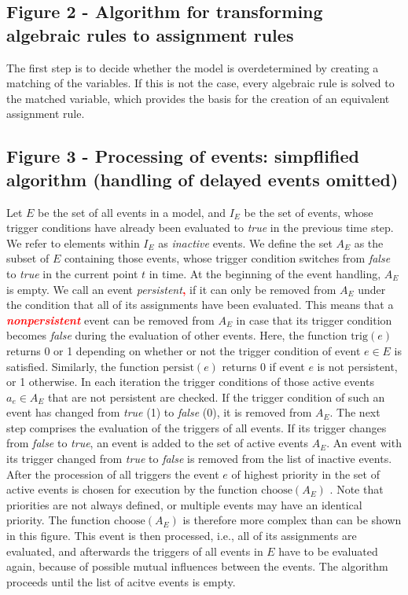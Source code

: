 \documentclass[10pt]{bmc_article}
\newenvironment{bmcformat}{\baselineskip20pt\sloppy\setboolean{publ}{false}}{\baselineskip20pt\sloppy}
\newcommand{\TODO}[1]{\textcolor{red}{\textbf{#1}}}
\newcommand{\true}{\emph{true}}
\newcommand{\false}{\emph{false}}
\begin{document}
\begin{bmcformat}
\subsection*{Figure 2 - Algorithm for transforming algebraic rules to assignment rules}
The first step is to decide whether the model is overdetermined by creating a matching of the variables.
If this is not the case, every algebraic rule is solved to the matched variable,
which provides the basis for the creation of an equivalent assignment rule.

\subsection*{Figure 3 - Processing of events: simpflified algorithm (handling of delayed events omitted)}
Let $E$ be the set of all events in a model, and $I_E$ be the set of events, whose trigger
conditions have already been evaluated to \true{} in the previous time step. We refer to elements within
$I_E$ as \emph{inactive} events. We define the set $A_E$ as the subset of $E$ containing those events,
whose trigger condition switches from \false{} to \true{} in the current point $t$ in time. At the beginning
of the event handling, $A_E$ is empty. We call an event \emph{persistent}\TODO{,} if it can only be removed from
$A_E$ under the condition that all of its assignments have been evaluated. This means that a
\TODO{\emph{nonpersistent}} event can be removed from $A_E$ in case that its trigger condition becomes \false{}
during the evaluation of other events. Here, the function $\mathrm{trig}(e)$ returns 0 or 1 depending 
on whether or not the trigger condition of event $e \in E$ is satisfied. Similarly, the function
$\mathrm{persist}(e)$ returns 0 if event $e$ is not persistent, or 1 otherwise.
In each iteration the trigger conditions of those active events $a_e \in A_E$ that are not persistent are checked.
If the trigger condition of such an event has changed from \true{} (1) to \false{} (0), it is removed from $A_E$.
The next step comprises the evaluation of the triggers of all events.
If its trigger changes from \false{} to \true{}, an event is added to the set of active events $A_E$.
An event with its trigger changed from \true{} to \false{} is removed from the list of inactive events.
After the procession of all triggers the event $e$ of highest priority in the set of active events is chosen for execution by the function $\mathrm{choose}(A_E)$ .
Note that priorities are not always defined, or multiple events may have an identical priority. The function $\mathrm{choose}(A_E)$ is therefore more complex than can be shown in this figure.
This event is then processed, i.e., all of its assignments are evaluated, and afterwards the triggers of all events in $E$ have to be evaluated again, because of possible mutual influences between the events.
The algorithm proceeds until the list of acitve events is empty.


\end{bmcformat}
\end{document}
